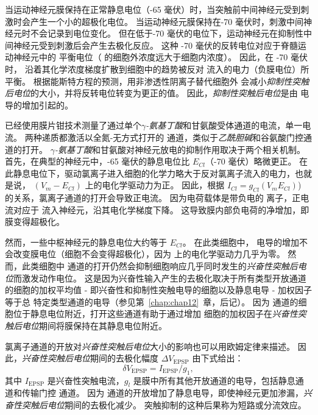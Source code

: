 当运动神经元膜保持在正常静息电位（-65 毫伏）时，当突触前中间神经元受到刺激时会产生一个小的超极化电位。
当运动神经元膜保持在-70 毫伏时，刺激中间神经元时不会记录到电位变化。
但在低于-70 毫伏的电位下，运动神经元在抑制性中间神经元受到刺激后会产生去极化反应。
这种 -70 毫伏的反转电位对应于脊髓运动神经元中的  平衡电位（ 的细胞外浓度远大于细胞内浓度）。
因此，在 -70 毫伏时， 沿着其化学浓度梯度扩散到细胞中的趋势被反对  流入的电力（负膜电位）所平衡。
根据能斯特方程的预测，用非渗透性阴离子替代细胞外  会减小\textit{抑制性突触后电位}的大小，并将反转电位转变为更正的值。
因此，\textit{抑制性突触后电位}是由  电导的增加引起的。


已经使用膜片钳技术测量了通过单个\textit{$\gamma$-氨基丁酸}和甘氨酸受体通道的电流，单一电流。
两种递质都激活以全氮-无方式打开的  通道，类似于\textit{乙酰胆碱}和谷氨酸门控通道的打开。
\textit{$\gamma$-氨基丁酸}和甘氨酸对神经元放电的抑制作用取决于两个相关机制。
首先，在典型的神经元中，-65 毫伏的静息电位比 $E_{Cl}$（-70 毫伏）略微更正。
在此静息电位下，驱动氯离子进入细胞的化学力略大于反对氯离子流入的电力，也就是说， $(V_m - E_{Cl})$ 上的电化学驱动力为正。
因此，根据 $ I_{Cl} = g_{Cl} (V_m E_{Cl})$) 的关系，氯离子通道的打开会导致正电流。 因为电荷载体是带负电的  离子，正电流对应于  流入神经元，沿其电化学梯度下降。
这导致膜内部负电荷的净增加，即膜变得超极化。


然而，一些中枢神经元的静息电位大约等于 $E_{Cl}$。
在此类细胞中， 电导的增加不会改变膜电位（细胞不会变得超极化），因为  上的电化学驱动力几乎为零。
然而，此类细胞中  通道的打开仍然会抑制细胞响应几乎同时发生的\textit{兴奋性突触后电位}而激发动作电位。
这是因为兴奋性输入产生的去极化取决于所有类型开放通道的细胞的加权平均值 - 即兴奋性和抑制性突触电导的细胞以及静息电导 - 加权因子等于总 特定类型通道的电导（参见第~\ref{chap:chap12}~章，后记）。
因为  通道的细胞位于静息电位附近，打开这些通道有助于通过增加  细胞的加权因子在\textit{兴奋性突触后电位}期间将膜保持在其静息电位附近。


氯离子通道的开放对\textit{兴奋性突触后电位}大小的影响也可以用欧姆定律来描述。
因此，\textit{兴奋性突触后电位}期间的去极化幅度 $ \Delta V_{\text{EPSP}} $ 由下式给出：
\begin{equation}\label{depolarization_amplitude}
	\delta V_{\text{EPSP}} = I_{\text{EPSP}} / g_1,
\end{equation}
其中 $ I_{\text{EPSP}} $ 是兴奋性突触电流，$ g_l $ 是膜中所有其他开放通道的电导，包括静息通道和传输门控  通道。
因为  通道的开放增加了静息电导，即使神经元更加渗漏，\textit{兴奋性突触后电位}期间的去极化减少。
突触抑制的这种后果称为短路或分流效应。


